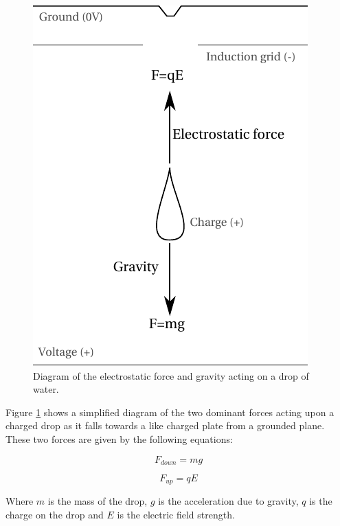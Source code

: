 \begin{figure}
\begin{centering}
\includegraphics{content/appendices/chargedWaterDrops/graphics/ChargedDrips_Figure_Diagram_Forces}
\par\end{centering}

\protect\caption{\label{Figure_Diagram_ChargedDrips_Figure_Diagram_Forces}Diagram
of the electrostatic force and gravity acting on a drop of water.}


\end{figure}


Figure \ref{Figure_Diagram_ChargedDrips_Figure_Diagram_Forces} shows
a simplified diagram of the two dominant forces acting upon a charged
drop as it falls towards a like charged plate from a grounded plane.
These two forces are given by the following equations:

\begin{equation}
F_{down}=mg
\end{equation}


\begin{equation}
F_{up}=qE
\end{equation}


Where $m$ is the mass of the drop, $g$ is the acceleration due to
gravity, $q$ is the charge on the drop and $E$ is the electric field
strength.
